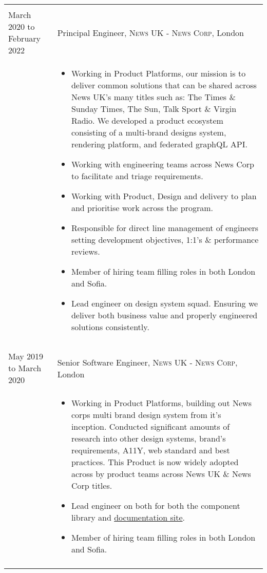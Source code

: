 \documentclass[a4paper,10pt]{article} %
\begin{document}
\begin{tabular}{ L{2cm} | L{11cm}}
	 \\
	March 2020 to February 2022 & Principal Engineer, \textsc{News UK - News Corp}, London \\
	&\MPtrue
	\begin{itemize}[leftmargin=*]
			\item Working in Product Platforms, our mission is to deliver common solutions that can be shared across News UK's many titles such as: The Times \& Sunday Times, The Sun, Talk Sport \& Virgin Radio. We developed a product ecosystem consisting of a multi-brand designs system, rendering platform, and federated graphQL API.
			\item Working with engineering teams across News Corp to facilitate and triage requirements.
			\item Working with Product, Design and delivery to plan and prioritise work across the program.
			\item Responsible for direct line management of engineers setting development objectives, 1:1's \& performance reviews.
			\item Member of hiring team filling roles in both London and Sofia.
			\item Lead engineer on design system squad. Ensuring we deliver both business value and properly engineered solutions consistently.
		\end{itemize} \\ 
	 \\

	 \\
	May 2019 to March 2020 & Senior Software Engineer, \textsc{News UK - News Corp}, London \\
	&\MPtrue
	\begin{itemize}[leftmargin=*]
			\item Working in Product Platforms, building out News corps multi brand design system from it's inception. Conducted significant amounts of research into other design systems, brand's requirements, A11Y, web standard and best practices. This Product is now widely adopted across by product teams across News UK \& News Corp titles.
			\item Lead engineer on both for both the component library and \href{https://newskit.co.uk}{documentation site}.
			\item Member of hiring team filling roles in both London and Sofia.			
		\end{itemize} \\
	 \\
\end{tabular}
\end{document}
